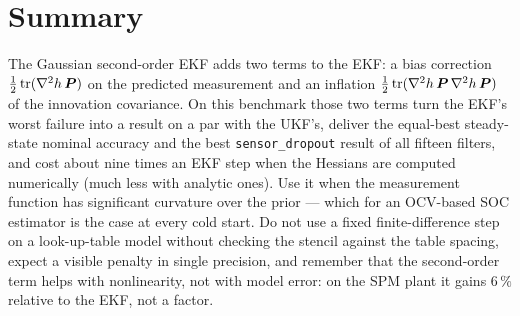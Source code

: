 \section{Summary}
The Gaussian second-order EKF adds two terms to the EKF: a bias correction
$\tfrac12\operatorname{tr}(\nabla^2h\,\bm{P})$ on the predicted measurement and an inflation
$\tfrac12\operatorname{tr}(\nabla^2h\,\bm{P}\,\nabla^2h\,\bm{P})$ of the innovation covariance. On this benchmark
those two terms turn the EKF's worst failure into a result on a par with the UKF's, deliver the
equal-best steady-state nominal accuracy and the best \texttt{sensor\_dropout} result of all
fifteen filters, and cost about nine times an EKF step when the Hessians are computed
numerically (much less with analytic ones). Use it when the measurement function has
significant curvature over the prior --- which for an OCV-based SOC estimator is the case at
every cold start. Do not use a fixed finite-difference step on a look-up-table model without
checking the stencil against the table spacing, expect a visible penalty in single precision,
and remember that the second-order term helps with nonlinearity, not with model error: on the
SPM plant it gains $6\,\%$ relative to the EKF, not a factor.

